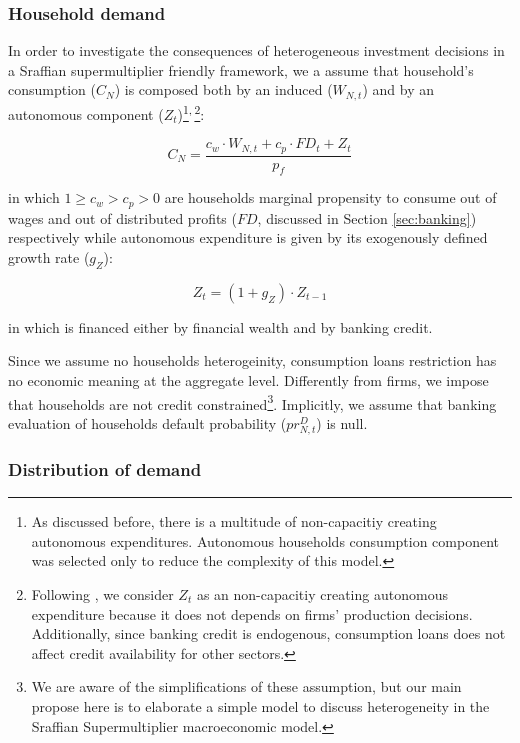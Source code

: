 \documentclass{SelfArx}
\begin{document}
\subsubsection{Household demand}
\label{sec:orgac29109}


In order to investigate the consequences of heterogeneous investment decisions in a Sraffian supermultiplier friendly framework, we a assume that household's consumption (\(C_{N}\)) is composed both by an induced (\(W_{N,t}\)) and by an autonomous component (\(Z_{t}\))\footnote{As discussed before, there is a multitude of non-capacitiy creating autonomous expenditures. Autonomous households consumption component was selected only to reduce the complexity of this model.}\textsuperscript{,}\,\footnote{Following \textcite{serrano_1995_Long}, we consider \(Z_{t}\) as an non-capacitiy creating autonomous expenditure because it does not depends on firms' production decisions. Additionally, since banking credit is endogenous, consumption loans does not affect credit availability for other sectors.}:

\begin{latex}
\begin{equation}
C_{N} = \frac{c_{w}\cdot W_{N,t} + c_{p}\cdot FD_{t} + Z_{t}}{p_{f}}
\end{equation}
\end{latex}
in which \(1 \geq c_{w} > c_{p} > 0\) are households marginal propensity to consume out of wages and out of distributed profits (\(FD\), discussed in Section \ref{sec:banking}) respectively while autonomous expenditure is given by its exogenously defined growth rate (\(g_{Z}\)):
\begin{latex}
\begin{equation}
Z_{t} = (1+g_{Z})\cdot Z_{t-1}
\end{equation}
\end{latex}
in which is financed either by financial wealth and by banking credit.

Since we assume no households heterogeinity, consumption loans restriction has no economic meaning at the aggregate level.
Differently from firms, we impose that households are not credit constrained\footnote{We are aware of the simplifications of these assumption, but our main propose here is to elaborate a simple model to discuss heterogeneity in the Sraffian Supermultiplier macroeconomic model.}.
Implicitly, we assume that banking evaluation of households default probability (\(pr^{D}_{N,t}\)) is null.

\subsubsection{Distribution of demand}
\label{sec:org72c6531}
\end{document}
